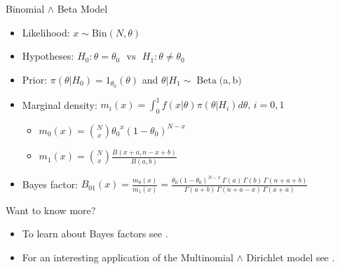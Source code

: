 \begin{frame}{Binomial $\land$ Beta Model}

\begin{itemize}

\item Likelihood: $x \sim \text{Bin}(N, \theta)$

\item  Hypotheses: $ H_0: {\theta}={\theta_0} \,\,\,\, \text{vs} \,\,\,\,  H_1: {\theta} \neq \theta_0$

\item Prior: $\pi(\theta|H_0)={1_{\theta_0}(\theta)}$ and $\theta| H_1 \sim \operatorname{Beta}($a$,$b$) $

\item Marginal density: $m_i(x)= \int_0^1 f(x|\theta)\pi(\theta|H_i)d \theta, \,  i=0, 1$

\begin{itemize}

\item $m_0(x)=\binom{N}{x} {\theta_0}^{x}{(1-\theta_0)}^{N-x}$ 

\item  $m_1(x) = \binom{N}{x}\frac{B(x+a, n-x+b)}{B(a,b)}$

\end{itemize}

\item Bayes factor: $B_{01}(x) = \frac{m_0(x)}{m_1(x)}  = \frac{\theta_0(1-\theta_0)^{N-x}\,\Gamma(a)\,\Gamma(b)\,\Gamma(n+a+b)}{\Gamma(a+b)\,\Gamma(n+a-x)\,\Gamma(x+a)}$ 

\end{itemize}

\end{frame}


\begin{frame}{Want to know more?}

\begin{itemize}

\item  To learn about Bayes factors see \cite{kass1995}.

\item For an interesting application of the Multinomial $\land$ Dirichlet model see \citet{pericchiTorres2011}.

\end{itemize}

\end{frame}

